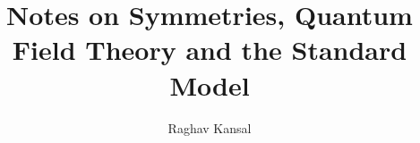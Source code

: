 \documentclass[12pt]{report}
\title{Notes on Symmetries, Quantum Field Theory and the Standard Model}
\author{Raghav Kansal}
\theoremstyle{definition}
\theoremstyle{definition}
\theoremstyle{definition}
\numberwithin{equation}{chapter}
\begin{document}

\maketitle

{
\hypersetup{linkcolor=black}
\tableofcontents
}

\setlength{\parskip}{0.6\baselineskip}



\begin{doublespace}






\nocite{apsrev42Control}

\end{doublespace}
 
\end{document}
